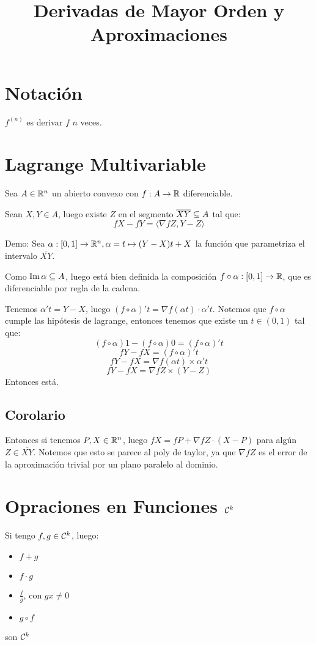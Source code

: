\documentclass{article}
\title{Derivadas de Mayor Orden y Aproximaciones}
\begin{document}
\maketitle
\section*{Notación}
$f^{(n)}$ es derivar $f$ $n$ veces.
\section*{Lagrange Multivariable}
Sea $A \in \mathbb{R}^n$ un abierto convexo
con $f : A \to \mathbb{R}$ diferenciable.

Sean $X, Y \in A$, luego existe $Z$ en el segmento $\overline{XY} \subseteq A$ tal que:
\[
	fX - fY = \langle\nabla f Z, Y-Z \rangle
\]

Demo: Sea $\alpha : [0,1] \to \mathbb{R}^n, \alpha = t \mapsto (Y-X)t + X$ la función que parametriza el intervalo $\overline{XY}$.

Como $\operatorname{Im} \alpha \subseteq A$, luego está bien definida la composición $f \circ \alpha : [0,1] \to \mathbb{R}$, que es diferenciable por regla de la cadena.

Tenemos $\alpha' t = Y-X$, luego $(f \circ \alpha)'t = \nabla f(\alpha t) \cdot \alpha' t$. Notemos que $f \circ \alpha$ cumple las hipótesis de lagrange, entonces tenemos que existe un $t \in (0, 1)$ tal que:
\[
	(f \circ \alpha)1 - (f \circ \alpha)0 = (f \circ \alpha)' t
\]
\[
	fY - fX = (f \circ \alpha)' t
\]
\[
	fY - fX = \nabla f(\alpha t) \times \alpha' t
\]
\[
	fY - fX = \nabla fZ \times (Y-Z) 
\]
Entonces está.

\subsection*{Corolario}
Entonces si tenemos $P, X \in \mathbb{R}^n$, luego $fX = fP + \nabla fZ \cdot (X-P)$ para algún $Z \in \overline{XY}$. Notemos que esto se parece al poly de taylor, ya que $\nabla fZ$ es el error de la aproximación trivial por un plano paralelo al dominio.

\section*{Opraciones en Funciones $\mathcal{C}^k$}
Si tengo $f, g \in \mathcal{C}^k$, luego:
\begin{itemize}
	\item $f + g$
	\item $f \cdot g$
	\item $\frac{f}{g}$, con $gx \neq 0$
	\item $g \circ f$
\end{itemize}
son $\mathcal{C}^k$
\end{document}
